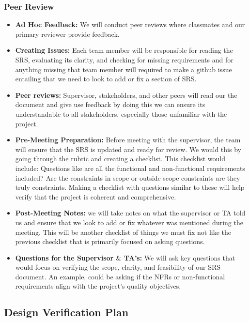 \documentclass[12pt, titlepage]{article}
\begin{document}
\subsubsection{Peer Review}
\begin{itemize}
    \item \textbf{Ad Hoc Feedback:} We will conduct peer reviews where classmates and our primary reviewer provide feedback. 
    \item \textbf{Creating Issues:} Each team member will be responsible for reading the SRS, evaluating its clarity, and checking for missing requirements and for anything missing that team member will required to make a github issue entailing that we need to look to add or fix a section of SRS. 
    \item \textbf{Peer reviews:} Supervisor, stakeholders, and other peers will read our the document and give use feedback by doing this we can ensure its understandable to all stakeholders, especially those unfamiliar with the project.
    \item \textbf{Pre-Meeting Preparation:} Before meeting with the supervisor, the team will ensure that the SRS is updated and ready for review. We would this by going through the rubric and creating a checklist. This checklist would include: Questions like are all the functional and non-functional requirements included? Are the constraints in scope or outside scope constraints are they truly constraints. Making a checklist with questions similar to these will help verify that the project is coherent and comprehensive.
    \item \textbf{Post-Meeting Notes:} we will take notes on what the supervisor or TA told us and ensure that we look to add or fix whatever was mentioned during the meeting. This will be another checklist of things we must fix not like the previous checklist that is primarily focused on asking questions. 
    \item \textbf{Questions for the Supervisor $\&$ TA's:} We will ask key questions that would focus on verifying the scope, clarity, and feasibility of our SRS document. An example, could be asking if the NFRs or non-functional requirements align with the project’s quality objectives.
\end{itemize}

\subsection{Design Verification Plan}
\end{document}
